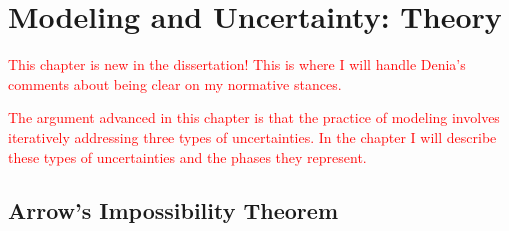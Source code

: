 







\chapter{Modeling and Uncertainty: Theory}

\textcolor{red}{This chapter is new in the dissertation! This is where I will handle 
Denia's comments about being clear on my normative stances.}

\textcolor{red}{The argument advanced in this chapter is that the practice of modeling
involves iteratively addressing three types of uncertainties. In the chapter I will
describe these types of uncertainties and the phases they represent.}

\section{Arrow's Impossibility Theorem}

